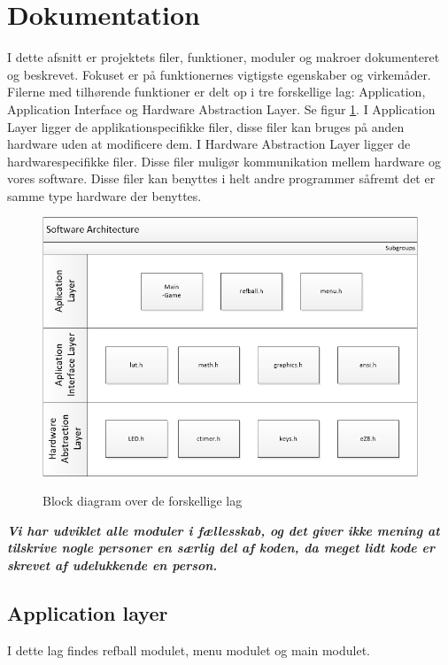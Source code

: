 \section{Dokumentation}

I dette afsnitt er projektets filer, funktioner, moduler og makroer dokumenteret og beskrevet. Fokuset er på funktionernes vigtigste egenskaber og virkemåder. Filerne med tilhørende funktioner er delt op i tre forskellige lag: Application, Application Interface og Hardware Abstraction Layer. Se figur \ref{block}.
 I Application Layer ligger de applikationspecifikke filer, disse filer kan bruges på anden hardware uden at modificere dem. I Hardware Abstraction Layer ligger de hardwarespecifikke filer. Disse filer muligør kommunikation mellem hardware og vores software. Disse filer kan benyttes i helt andre programmer såfremt det er samme type hardware der benyttes. 

\begin{figure}[h]
\begin{center}
\label{block}
\includegraphics[scale=0.6]{img/SoftwareArchitecture.png}
\caption{Block diagram over de forskellige lag}
\end{center}
\end{figure}
\textit{\textbf{Vi har udviklet alle moduler i fællesskab, og det giver ikke mening at tilskrive nogle personer en særlig del af koden, da meget lidt kode er skrevet af udelukkende en person.} }
\newpage
\subsection{Application layer}
I dette lag findes refball modulet, menu modulet og main modulet.
